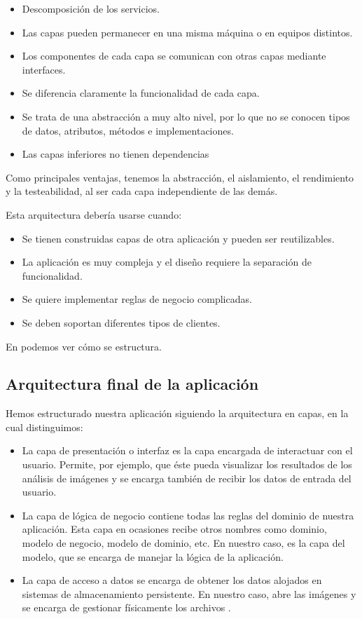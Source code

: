 \begin{itemize}
\item Descomposición de los servicios.
\item Las capas pueden permanecer en una misma máquina o en equipos distintos.
\item Los componentes de cada capa se comunican con otras capas mediante interfaces.
\item Se diferencia claramente la funcionalidad de cada capa.
\item Se trata de una abstracción a muy alto nivel, por lo que no se conocen tipos de datos, atributos, métodos e implementaciones.
\item Las capas inferiores no tienen dependencias
\end{itemize}

Como principales ventajas, tenemos la abstracción, el aislamiento, el rendimiento y la testeabilidad, al ser cada capa independiente de las demás.

Esta arquitectura debería usarse cuando:

\begin{itemize}
\item Se tienen construidas capas de otra aplicación y pueden ser reutilizables.
\item La aplicación es muy compleja y el diseño requiere la separación de funcionalidad.
\item Se quiere implementar reglas de negocio complicadas.
\item Se deben soportan diferentes tipos de clientes.
\end{itemize}

En  podemos ver cómo se estructura.


\subsection{Arquitectura final de la aplicación}
Hemos estructurado nuestra aplicación siguiendo la arquitectura en capas, en la cual distinguimos:

\begin{itemize}
\item La capa de presentación o interfaz es la capa encargada de interactuar con el usuario. Permite, por ejemplo, que éste pueda visualizar los resultados de los análisis de imágenes y se encarga también de recibir los datos de entrada del usuario.
\item La capa de lógica de negocio contiene todas las reglas del dominio de nuestra aplicación. Esta capa en ocasiones recibe otros nombres como dominio, modelo de negocio, modelo de dominio, etc. En nuestro caso, es la capa del modelo, que se encarga de manejar la lógica de la aplicación.
\item La capa de acceso a datos se encarga de obtener los datos alojados en sistemas de almacenamiento persistente. En nuestro caso, abre las imágenes y se encarga de gestionar físicamente los archivos \arff{}.
\end{itemize}

